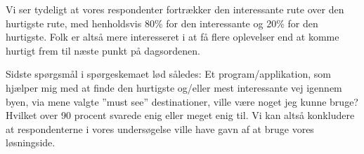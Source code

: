 Vi ser tydeligt at vores respondenter fortrækker den interessante rute over den hurtigste rute, med henholdsvis 80\% for den interessante og 20\% for den hurtigste. Folk er altså mere interesseret i at få flere oplevelser end at komme hurtigt frem til næste punkt på dagsordenen.

Sidste spørgsmål i spørgeskemaet lød således:
Et program/applikation, som hjælper mig med at finde den hurtigste og/eller mest interessante vej igennem byen, via mene valgte ”must see” destinationer, ville være noget jeg kunne bruge?
Hvilket over 90 procent svarede enig eller meget enig til. Vi kan altså konkludere at respondenterne i vores undersøgelse ville have gavn af at bruge vores løsningside. 
